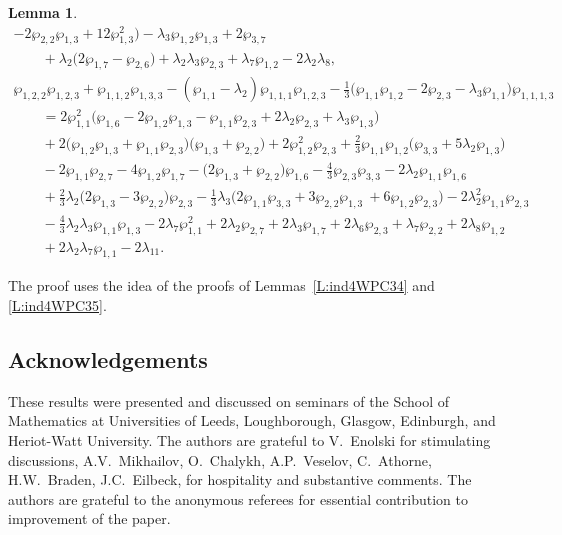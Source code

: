 \documentclass[pdftex]{sigma}
\numberwithin{equation}{section}
\newtheorem{Lemma}[Theorem]{Lemma}
\begin{document}
\begin{Lemma}
\begin{gather*}
 -2 \wp_{2,2} \wp_{1,3} + 12 \wp_{1,3}^2 \big) - \lambda_3 \wp_{1,2} \wp_{1,3} + 2 \wp_{3,7}\\
\qquad{} + \lambda_2 \big(2\wp_{1,7} - \wp_{2,6} \big) + \lambda_2 \lambda_3 \wp_{2,3} + \lambda_7 \wp_{1,2} - 2\lambda_2 \lambda_8,\\
 \wp_{1,2,2}\wp_{1,2,3} + \wp_{1,1,2}\wp_{1,3,3} - (\wp_{1,1} - \lambda_2) \wp_{1,1,1}\wp_{1,2,3}
 - \tfrac{1}{3} \big( \wp_{1,1} \wp_{1,2} - 2 \wp_{2,3} - \lambda_3 \wp_{1,1}\big) \wp_{1,1,1,3} \\
 \qquad{} = 2\wp_{1,1}^2 \big(\wp_{1,6} - 2 \wp_{1,2} \wp_{1,3} - \wp_{1,1} \wp_{2,3} + 2 \lambda_2 \wp_{2,3}
 + \lambda_3 \wp_{1,3}\big)\\
 \qquad{} + 2 \big(\wp_{1,2}\wp_{1,3} + \wp_{1,1} \wp_{2,3} \big) \big(\wp_{1,3} + \wp_{2,2} \big)
 + 2 \wp_{1,2}^2 \wp_{2,3} + \tfrac{2}{3} \wp_{1,1} \wp_{1,2} \big(\wp_{3,3} + 5\lambda_2 \wp_{1,3} \big)\\
 \qquad{} -2\wp_{1,1} \wp_{2,7} - 4 \wp_{1,2} \wp_{1,7} - \big(2\wp_{1,3} + \wp_{2,2}\big) \wp_{1,6} - \tfrac{4}{3} \wp_{2,3} \wp_{3,3} - 2\lambda_2 \wp_{1,1} \wp_{1,6}\\
 \qquad{} + \tfrac{2}{3} \lambda_2 \big(2\wp_{1,3} - 3\wp_{2,2}\big) \wp_{2,3}
 - \tfrac{1}{3} \lambda_3 \big(2 \wp_{1,1} \wp_{3,3} + 3 \wp_{2,2}\wp_{1,3}\ + 6 \wp_{1,2} \wp_{2,3}\big) - 2\lambda_2^2 \wp_{1,1} \wp_{2,3} \\
\qquad{} - \tfrac{4}{3} \lambda_2 \lambda_3 \wp_{1,1} \wp_{1,3}
 - 2 \lambda_7 \wp_{1,1}^2 + 2\lambda_2 \wp_{2,7} + 2\lambda_3 \wp_{1,7} + 2\lambda_6 \wp_{2,3}
 + \lambda_7 \wp_{2,2} + 2 \lambda_8 \wp_{1,2} \\
 \qquad{} + 2\lambda_2 \lambda_7 \wp_{1,1} - 2\lambda_{11}.
\end{gather*}
\end{Lemma}
The proof uses the idea of the proofs of Lemmas~\ref{L:ind4WPC34} and \ref{L:ind4WPC35}.

\vspace{-1mm}

\subsection*{Acknowledgements}
These results were presented and discussed on seminars of the School of Mathematics at Universities of Leeds, Loughborough, Glasgow, Edinburgh, and Heriot-Watt University. The authors are grateful to V.~Enolski for stimulating discussions, A.V.~Mikhailov, O.~Chalykh, A.P.~Veselov, C.~Athorne, H.W.~Braden, J.C.~Eilbeck, for hospitality and substantive comments. The authors are grateful to the anonymous referees for essential contribution to improvement of the paper.
\end{document}
